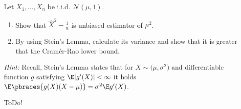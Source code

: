 
\begin{exercise}

Let $X_1, \dots, X_n$ be i.i.d. $\mathcal N(\mu, 1)$.

\begin{enumerate}[label = (\alph*)]
    \item Show that $\hat X^2 - \frac{1}{n}$ is unbiased estimator of $\mu^2$.
    \item By using Stein's Lemma, calculate its variance and show that it is greater that the Cramér-Rao lower bound.
\end{enumerate}

\textit{Hint:}
Recall, Stein's Lemma states that for $X \sim \mathcal(\mu, \sigma^2)$ and differentiable function $g$ satisfying $\E|g^\prime(X)| < \infty$ it holds $\E \pbraces{g(X) (X - \mu)} = \sigma^2 \E g^\prime(X)$.

\end{exercise}


\begin{solution}

ToDo!

\end{solution}

